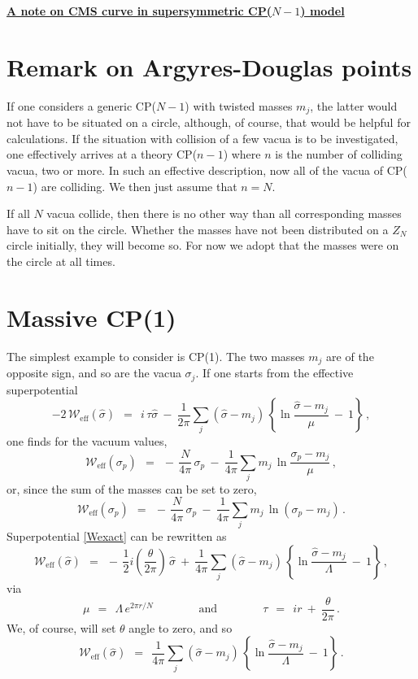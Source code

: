 \documentclass[12pt]{article}
\def\beq{\begin{equation}}
\def\eeq{\end{equation}}
\newcommand{\mc}[1]{\mathcal{#1}}
\newcommand{\hsigma}{{\hat{\sigma}}}
\begin{document}
{\centering\bf
\large\underline{A note on CMS curve in supersymmetric CP($N-1$) model}}

\section*{Remark on Argyres-Douglas points}
	If one considers a generic CP($N-1$) with twisted masses $m_j$, the latter would not have to be
situated on a circle, although, of course, that would be helpful for calculations. 
	If the situation with collision of a few vacua is to be investigated, one effectively arrives
at a theory CP($n-1$) where $n$ is the number of colliding vacua, two or more. 
	In such an effective description, now all of the vacua of CP($n-1$) are colliding. 
We then just assume that $ n = N $.

	If all $N$ vacua collide, then there is no other way than all corresponding masses
have to sit on the circle. 
	Whether the masses have not been distributed on a $Z_N$ circle initially, they will
become so. For now we adopt that the masses were on the circle at all times.

\section*{Massive CP(1)}

	The simplest example to consider is CP(1). 
The two masses $m_j$ are of the opposite sign, and so are the vacua $\sigma_j$.
If one starts from the effective superpotential
\beq
\label{Wexact}
	-2\, \mc{W}_\text{eff} (\hsigma) ~~=~~ i\, \tau\hsigma ~-~ 
		\frac{1}{2\pi} \sum_j (\hsigma - m_j)\, 
				      \left\{ \ln {\frac{\hsigma - m_j}{\mu}} ~-~ 1 \right\}\,,
\eeq
one finds for the vacuum values, 
\beq
	\mc{W}_\text{eff} (\sigma_p) ~~=~~ -\, \frac{N}{4\pi}\,\sigma_p ~-~
				\frac{1}{4\pi} \sum_j m_j\, \ln \frac{\sigma_p - m_j}{\mu}\,,
\eeq
or, since the sum of the masses can be set to zero,
\beq
\label{vvalue}
	\mc{W}_\text{eff} (\sigma_p) ~~=~~ -\, \frac{N}{4\pi}\,\sigma_p ~-~
				\frac{1}{4\pi} \sum_j m_j\, \ln ( \sigma_p - m_j ) \,.
\eeq
	Superpotential \eqref{Wexact} can be rewritten as
\beq
	\mc{W}_\text{eff} (\hsigma) ~~=~~-\, \frac{1}{2}i \left(\frac{\theta}{2\pi}\right)\, \hsigma ~+~
		\frac{1}{4\pi} \sum_j (\hsigma - m_j)\, 
					\left\{ \ln \frac{\hsigma - m_j}{\Lambda} ~-~ 1 \right\}\,,
\eeq
	via
\beq
	\mu ~~=~~ \Lambda\, e^{2\pi r/N}   
	\qquad\qquad \text{and} \qquad\qquad
	\tau ~~=~~ i r ~+~ \frac{\theta}{2\pi}\,.
\eeq
	We, of course, will set $ \theta $ angle to zero, and so
\beq
\label{Weff}
	\mc{W}_\text{eff} (\hsigma) ~~=~~ \frac{1}{4\pi} \sum_j (\hsigma - m_j)\, 
					  \left\{ \ln \frac{\hsigma - m_j}{\Lambda} ~-~ 1 \right\}\,.
\eeq
\end{document}
